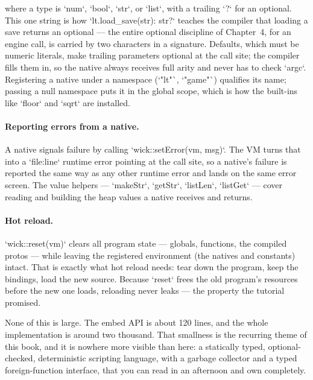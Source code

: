 \noindent
where a type is `num`, `bool`, `str`, or `list`, with a trailing `?` for an
optional. This one string is how `lt.load_save(str): str?` teaches the
compiler that loading a save returns an optional --- the entire optional
discipline of Chapter~4, for an engine call, is carried by two characters in a
signature. Defaults, which must be numeric literals, make trailing parameters
optional at the call site; the compiler fills them in, so the native always
receives full arity and never has to check `argc`. Registering a native under
a namespace (`"lt"`, `"game"`) qualifies its name; passing a null namespace
puts it in the global scope, which is how the built-ins like `floor` and
`sqrt` are installed.

\paragraph{Reporting errors from a native.} A native signals failure by
calling `wick::setError(vm, msg)`. The VM turns that into a `file:line`
runtime error pointing at the call site, so a native's failure is reported the
same way as any other runtime error and lands on the same error screen. The
value helpers --- `makeStr`, `getStr`, `listLen`, `listGet` --- cover reading
and building the heap values a native receives and returns.

\paragraph{Hot reload.} `wick::reset(vm)` clears all program state --- globals,
functions, the compiled protos --- while leaving the registered environment
(the natives and constants) intact. That is exactly what hot reload needs:
tear down the program, keep the bindings, load the new source. Because
`reset` frees the old program's resources before the new one loads, reloading
never leaks --- the property the tutorial promised.

None of this is large. The embed API is about 120 lines, and the whole
implementation is around two thousand. That smallness is the recurring theme
of this book, and it is nowhere more visible than here: a statically typed,
optional-checked, deterministic scripting language, with a garbage collector
and a typed foreign-function interface, that you can read in an afternoon and
own completely.
